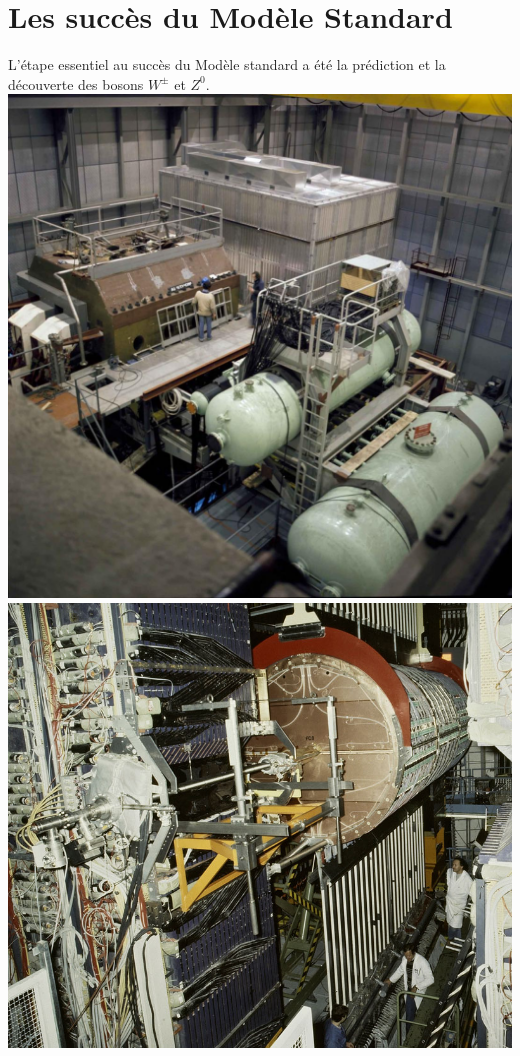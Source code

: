 \section{Les succès du Modèle Standard}
L'étape essentiel au succès du Modèle standard a été la prédiction et la découverte des bosons $W^{\pm}$ et $Z^{0}$.\marginpar
{
\centering
\includegraphics[width=\marginparwidth]{SM/gargamelle.jpg}
\label{GARGAMELLE}
}
\marginpar
{
\centering
\includegraphics[width=\marginparwidth]{SM/ua1.jpg}
\label{UA1}
}

